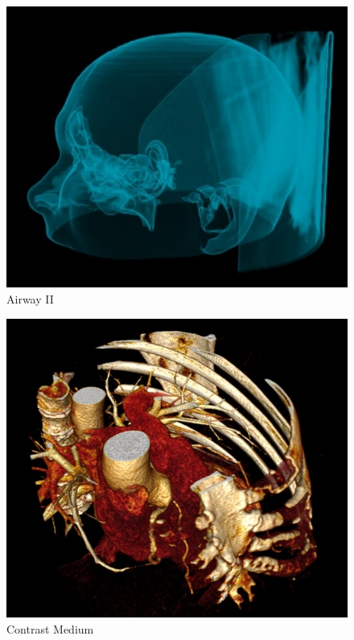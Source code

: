 \begin{figure}[!htb]
\centering 
\includegraphics[scale=0.65]{../user_guide_figures/invesalius_screen/vias_aereas_II.jpg}
\caption{Airway II}
\label{fig:vias_aereas_II} 
\end{figure}

\begin{figure}[!htb]
\centering
\includegraphics[scale=0.42]{../user_guide_figures/invesalius_screen/contraste_medio.jpg}
\caption{Contrast Medium}
\label{fig:contraste_medio}
\end{figure}

